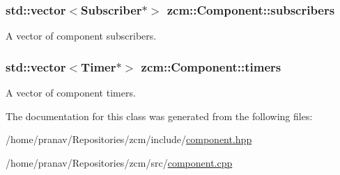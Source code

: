 \subsubsection[{\texorpdfstring{subscribers}{subscribers}}]{\setlength{\rightskip}{0pt plus 5cm}std\+::vector$<${\bf Subscriber}$\ast$$>$ zcm\+::\+Component\+::subscribers\hspace{0.3cm}{\ttfamily [protected]}}\hypertarget{classzcm_1_1Component_a9f9e58fb5d2189b183ffd22ce905d620}{}\label{classzcm_1_1Component_a9f9e58fb5d2189b183ffd22ce905d620}


A vector of component subscribers. 

\subsubsection[{\texorpdfstring{timers}{timers}}]{\setlength{\rightskip}{0pt plus 5cm}std\+::vector$<${\bf Timer}$\ast$$>$ zcm\+::\+Component\+::timers\hspace{0.3cm}{\ttfamily [protected]}}\hypertarget{classzcm_1_1Component_a506eac4aebc9e02f0df246afbbac7d75}{}\label{classzcm_1_1Component_a506eac4aebc9e02f0df246afbbac7d75}


A vector of component timers. 



The documentation for this class was generated from the following files\+:\begin{DoxyCompactItemize}
\item 
/home/pranav/\+Repositories/zcm/include/\hyperlink{component_8hpp}{component.\+hpp}\item 
/home/pranav/\+Repositories/zcm/src/\hyperlink{component_8cpp}{component.\+cpp}\end{DoxyCompactItemize}
